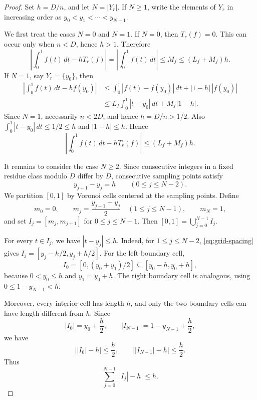 \documentclass[twoside,12pt]{article}
\newcommand{\1}{\mathbf 1}
\begin{document}
\begin{proof}
Set \(h=D/n\), and let \(N=|Y_r|\).  If \(N\ge1\), write the elements of
\(Y_r\) in increasing order as \(y_0<y_1<\cdots<y_{N-1}\).

We first treat the cases \(N=0\) and \(N=1\).  If \(N=0\), then
\(T_r(f)=0\).  This can occur only when \(n<D\), hence \(h>1\).  Therefore
\[
\left|\int_0^1 f(t)\,dt-hT_r(f)\right|
=
\left|\int_0^1 f(t)\,dt\right|
\le M_f
\le (L_f+M_f)h.
\]
If \(N=1\), say \(Y_r=\{y_0\}\), then
\[
\begin{aligned}
\left|\int_0^1 f(t)\,dt-hf(y_0)\right|
&\le
\int_0^1 |f(t)-f(y_0)|\,dt
+
|1-h|\,|f(y_0)|  \\
&\le
L_f\int_0^1 |t-y_0|\,dt
+
M_f|1-h|.
\end{aligned}
\]
Since \(N=1\), necessarily \(n<2D\), and hence \(h=D/n>1/2\).  Also
\(\int_0^1 |t-y_0|\,dt\le 1/2\le h\) and \(|1-h|\le h\).  Hence
\[
\left|\int_0^1 f(t)\,dt-hT_r(f)\right|
\le (L_f+M_f)h.
\]

It remains to consider the case \(N\ge2\).  Since consecutive integers in a
fixed residue class modulo \(D\) differ by \(D\), consecutive sampling points
satisfy
\begin{equation}\label{eq:grid-spacing}
y_{j+1}-y_j=h
\qquad (0\le j\le N-2).
\end{equation}
We partition \([0,1]\) by Voronoi cells centered at the sampling points.
Define
\[
m_0=0,
\qquad
m_j=\frac{y_{j-1}+y_j}{2}\quad (1\le j\le N-1),
\qquad
m_N=1,
\]
and set \(I_j=[m_j,m_{j+1}]\) for \(0\le j\le N-1\).  Then
\([0,1]=\bigcup_{j=0}^{N-1}I_j\).

For every \(t\in I_j\), we have \(|t-y_j|\le h\).  Indeed, for
\(1\le j\le N-2\), \eqref{eq:grid-spacing} gives
\(I_j=[y_j-h/2,y_j+h/2]\).  For the left boundary cell,
\[
I_0=[0,(y_0+y_1)/2]\subseteq [y_0-h,y_0+h],
\]
because \(0<y_0\le h\) and \(y_1=y_0+h\).  The right boundary cell is
analogous, using \(0\le 1-y_{N-1}<h\).

Moreover, every interior cell has length \(h\), and only the two boundary
cells can have length different from \(h\).  Since
\[
|I_0|=y_0+\frac h2,
\qquad
|I_{N-1}|=1-y_{N-1}+\frac h2,
\]
we have
\[
\bigl||I_0|-h\bigr|
\le \frac h2,
\qquad
\bigl||I_{N-1}|-h\bigr|
\le \frac h2.
\]
Thus
\begin{equation}\label{eq:length-deviation}
\sum_{j=0}^{N-1}\bigl||I_j|-h\bigr|\le h.
\end{equation}


\end{proof}
\end{document}
